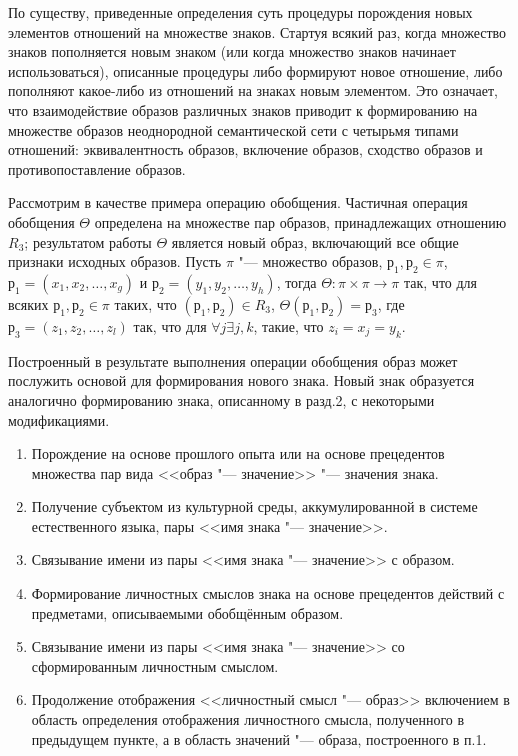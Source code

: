По существу, приведенные определения суть процедуры порождения новых элементов отношений на множестве знаков. Стартуя всякий раз, когда множество знаков пополняется новым знаком (или когда множество знаков начинает использоваться), описанные процедуры либо формируют новое отношение, либо пополняют какое-либо из отношений на знаках новым элементом. Это означает, что взаимодействие образов различных знаков приводит к формированию на множестве образов неоднородной семантической сети \cite{Osipov1990} с четырьмя типами отношений: эквивалентность образов, включение образов, сходство образов и противопоставление образов.

Рассмотрим в качестве примера операцию обобщения. Частичная операция обобщения $\Theta$ определена на множестве пар образов, принадлежащих отношению $R_3$; результатом работы $\Theta$ является новый образ, включающий все общие признаки исходных образов. Пусть $\pi$ "--- множество образов, $р_1,р_2\in\pi$, $р_1=(x_1,x_2,\dots,x_g)$ и $р_2=(y_1,y_2,\dots,y_h)$, тогда $\Theta:\pi\times\pi\rightarrow\pi$ так, что для всяких $р_1,р_2\in\pi$ таких, что $(р_1,р_2)\in R_3$, $\Theta(р_1,р_2)=р_3$, где $р_3=(z_1,z_2,\dots,z_l)$ так, что для $\forall j\exists j,k$, такие, что $z_i=x_j=y_k$.

Построенный в результате выполнения операции обобщения образ может послужить основой для формирования нового знака. Новый знак образуется аналогично формированию знака, описанному в разд.2, с некоторыми модификациями.
\begin{enumerate}
	\renewcommand\labelenumi{\theenumi.}
	\item Порождение на основе прошлого опыта или на основе прецедентов множества пар вида <<образ "--- значение>> "--- значения знака.
	\item Получение субъектом из культурной среды, аккумулированной в системе естественного языка, пары <<имя знака "--- значение>>.
	\item Связывание имени из пары <<имя знака "--- значение>> с образом.
	\item Формирование личностных смыслов знака на основе прецедентов действий с предметами, описываемыми обобщённым образом.
	\item Связывание имени из пары <<имя знака "--- значение>> со сформированным личностным смыслом.
	\item Продолжение отображения <<личностный смысл "--- образ>> включением в область определения отображения личностного смысла, полученного в предыдущем пункте, а в область значений "--- образа, построенного в п.1.
\end{enumerate}

